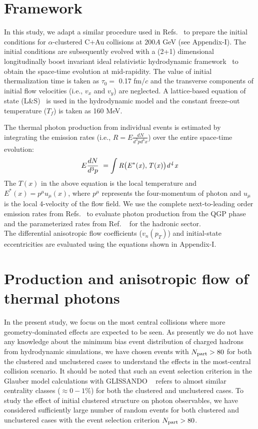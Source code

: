 \documentclass[aps,prc,twocolumn,floatfix,12pts,superscriptaddress]{revtex4}
\begin{document}
\section{Framework}
{In this study, we adapt a similar procedure used in Refs.~\cite{Bozek:2014cva,Dasgupta:2020orj} to prepare the initial conditions for $\alpha$-clustered C+Au collisions at $200A$ GeV  (see Appendix-I).  The initial conditions are subsequently evolved with a (2+1) dimensional longitudinally boost invariant ideal relativistic hydrodynamic framework~\cite{Holopainen:2010gz}  to obtain the space-time evolution at mid-rapidity. The value of initial thermalization time is taken as $\tau_0=$ 0.17 fm/$c$  and the transverse components of initial flow velocities (i.e., $v_x$ and $v_y$) are neglected.  A lattice-based equation of state {(L\&S)}~\cite{Laine:2006cp} is used in the hydrodynamic model and the constant freeze-out temperature ($ T_f$) is taken as 160 MeV.

The thermal photon production from individual events  is estimated by integrating the  emission rates (i.e., $R=E\frac{dN}{d^3pd^4x}$) over the entire space-time evolution:
		\begin{eqnarray}
	{E \frac{dN}{d^3p} \ =  \int \it{R}\big(E^*(x),T(x)\big)d^4x}
	\label{dn_phot}
\end{eqnarray}
The $T(x)$ in the above equation is the local temperature and $E^*(x)=p^\mu u_\mu(x)$, where $p^\mu$  represents the four-momentum of photon and $u_\mu$ is the local 4-velocity of the flow field. We use the complete next-to-leading order emission rates from Refs.~\cite{Arnold:2001ms,Ghiglieri:2013gia}  to evaluate photon production from the  QGP phase and the parameterized rates from Ref. ~\cite{Turbide:2003si}  for the hadronic sector. \\
The differential anisotropic flow coefficients ($v_n(p_T)$) and initial-state eccentricities are evaluated using the equations shown in Appendix-I. }

\section{Production and anisotropic flow of thermal photons}

In the present study, we focus on the most central collisions where more geometry-dominated effects are expected to be seen. As presently we do not have any knowledge about the minimum bias event distribution of charged hadrons from hydrodynamic simulations, we have chosen events with  $N_{\rm part} >80$ for both the clustered and unclustered cases to understand the effects in the most-central collision scenario. It should be noted that such an event selection criterion in the Glauber model calculations with GLISSANDO ~\cite{Broniowski:2007nz} refers to almost similar centrality classes ($\approx 0-1\%$) for both the clustered and unclustered cases. To study the effect of initial clustered structure on photon observables, we have considered sufficiently large number of random events for both clustered and unclustered cases with the event selection criterion  $ N_{\rm part} >80$.  \\
\end{document}
